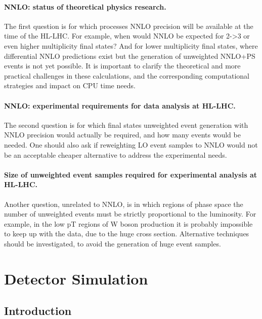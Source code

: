 \documentclass[11pt,a4paper]{article}
\begin{document}
\paragraph{NNLO: status of theoretical physics research.} The first question is
for which processes NNLO precision will be available at the time of the
HL-LHC. For example, when would NNLO be expected for 2-\textgreater3 or
even higher multiplicity final states? And for lower multiplicity final
states, where differential NNLO predictions exist but the generation of
unweighted NNLO+PS events is not yet possible. It is important to
clarify the theoretical and more practical challenges in these
calculations, and the corresponding computational strategies and impact
on CPU time needs.

\paragraph{NNLO: experimental requirements for data analysis at HL-LHC.} The
second question is for which final states unweighted event generation
with NNLO precision would actually be required, and how many events
would be needed. One should also ask if reweighting LO event samples to
NNLO would not be an acceptable cheaper alternative to address the
experimental needs.

\paragraph{Size of unweighted event samples required for experimental analysis
at HL-LHC.} Another question, unrelated to NNLO, is in which regions of
phase space the number of unweighted events must be strictly
proportional to the luminosity. For example, in the low pT regions of W
boson production it is probably impossible to keep up with the data, due
to the huge cross section. Alternative techniques should be
investigated, to avoid the generation of huge event samples.


\hypertarget{detector-simulation}{%
\section{Detector Simulation}\label{detector-simulation}}

\hypertarget{introduction-2}{%
\subsection{Introduction}\label{introduction-2}}
\end{document}
